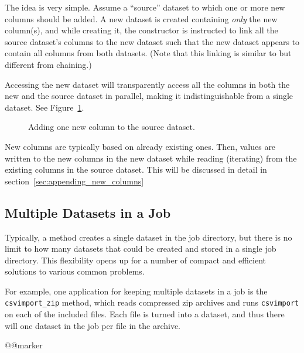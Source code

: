 The idea is very simple.  Assume a ``source'' dataset to which one or
more new columns should be added.  A new dataset is created containing
\textsl{only} the new column(s), and while creating it, the
constructor is instructed to link all the source dataset's columns to
the new dataset such that the new dataset appears to contain all
columns from both datasets.  (Note that this linking is similar to but
different from chaining.)

Accessing the new dataset will transparently access all the columns in
both the new and the source dataset in parallel, making it
indistinguishable from a single dataset.  See
Figure~\ref{fig:dep_dataset_append_column}.

\begin{figure}[b]
  \begin{center}
    
    \caption{Adding one new column to the source dataset.}
    \label{fig:dep_dataset_append_column}
  \end{center}
\end{figure}

New columns are typically based on already existing ones.  Then,
values are written to the new columns in the new dataset while reading
(iterating) from the existing columns in the source dataset.  This
will be discussed in detail in section~\ref{sec:appending_new_columns}



\subsection{Multiple Datasets in a Job}

Typically, a method creates a single dataset in the job directory, but
there is no limit to how many datasets that could be created and
stored in a single job directory.  This flexibility opens up for a
number of compact and efficient solutions to various common problems.

For example, one application for keeping multiple datasets in a job is
the \texttt{csvimport\_zip} method, which reads compressed zip
archives and runs \texttt{csvimport} on each of the included files.
Each file is turned into a dataset, and thus there will one dataset in
the job per file in the archive.

@@marker


